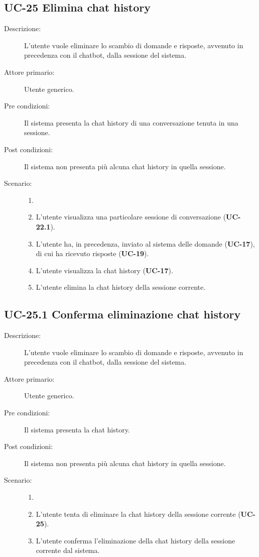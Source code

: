\subsection{UC-25 Elimina chat history}
\begin{description}
    \item[Descrizione:] L'utente vuole eliminare lo scambio di domande e risposte, avvenuto in precedenza con il chatbot, dalla sessione del sistema.
    \item[Attore primario:] Utente generico.
    \item[Pre condizioni:] Il sistema presenta la chat history di una conversazione tenuta in una sessione.
    \item[Post condizioni:] Il sistema non presenta più alcuna chat history in quella sessione.
    \item[Scenario:]
    \begin{enumerate}
        \item[]
        \item L'utente visualizza una particolare sessione di conversazione (\textbf{UC-22.1}).
        \item L'utente ha, in precedenza, inviato al sistema delle domande (\textbf{UC-17}), di cui ha ricevuto risposte (\textbf{UC-19}).
        \item L'utente visualizza la chat history (\textbf{UC-17}).
        \item L'utente elimina la chat history della sessione corrente.
    \end{enumerate}
\end{description}

\subsection{UC-25.1 Conferma eliminazione chat history}
\begin{description}
    \item[Descrizione:] L'utente vuole eliminare lo scambio di domande e risposte, avvenuto in precedenza con il chatbot, dalla sessione del sistema.
    \item[Attore primario:] Utente generico.
    \item[Pre condizioni:] Il sistema presenta la chat history.
    \item[Post condizioni:] Il sistema non presenta più alcuna chat history in quella sessione.
    \newpage
    \item[Scenario:]
    \begin{enumerate}
        \item[]
        \item L'utente tenta di eliminare la chat history della sessione corrente (\textbf{UC-25}).
        \item L'utente conferma l'eliminazione della chat history della sessione corrente dal sistema.
    \end{enumerate}
\end{description}

